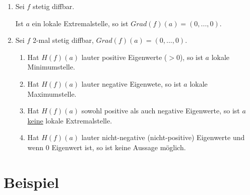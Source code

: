 \documentclass[a4paper, openany]{book}
\begin{document}
          \begin{enumerate}[label=(\alph*)]
            \item Sei $f$ stetig diffbar.

            Ist $a$ ein lokale Extremalstelle, so ist $Grad(f)(a) = (0,...,0)$.

            \item Sei $f$ 2-mal stetig diffbar, $Grad(f)(a) = (0,...,0)$.

            \begin{enumerate}
              \item Hat $H(f)(a)$ lauter positive Eigenwerte ($> 0$), so ist $a$ lokale Minimumstelle.

              \item Hat $H(f)(a)$ lauter negative Eigenwete, so ist $a$ lokale Maximumstelle.

              \item Hat $H(f)(a)$ sowohl positive als auch negative Eigenwerte, so ist $a$ \underline{keine} lokale Extremalstelle.

              \item Hat $H(f)(a)$ lauter nicht-negative (nicht-positive) Eigenwerte und wenn 0 Eigenwert ist, so ist keine Aussage möglich.
            \end{enumerate}
          \end{enumerate}

          \section{Beispiel}
\end{document}
